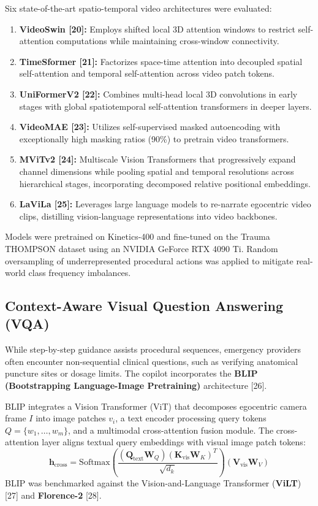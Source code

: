 \documentclass[12pt,a4paper]{report}
\begin{document}
Six state-of-the-art spatio-temporal video architectures were evaluated:
\begin{enumerate}
    \item \textbf{VideoSwin [20]:} Employs shifted local 3D attention windows to restrict self-attention computations while maintaining cross-window connectivity.
    \item \textbf{TimeSformer [21]:} Factorizes space-time attention into decoupled spatial self-attention and temporal self-attention across video patch tokens.
    \item \textbf{UniFormerV2 [22]:} Combines multi-head local 3D convolutions in early stages with global spatiotemporal self-attention transformers in deeper layers.
    \item \textbf{VideoMAE [23]:} Utilizes self-supervised masked autoencoding with exceptionally high masking ratios (90\%) to pretrain video transformers.
    \item \textbf{MViTv2 [24]:} Multiscale Vision Transformers that progressively expand channel dimensions while pooling spatial and temporal resolutions across hierarchical stages, incorporating decomposed relative positional embeddings.
    \item \textbf{LaViLa [25]:} Leverages large language models to re-narrate egocentric video clips, distilling vision-language representations into video backbones.
\end{enumerate}

Models were pretrained on Kinetics-400 and fine-tuned on the Trauma THOMPSON dataset using an NVIDIA GeForce RTX 4090 Ti. Random oversampling of underrepresented procedural actions was applied to mitigate real-world class frequency imbalances.

\subsection{Context-Aware Visual Question Answering (VQA)}
While step-by-step guidance assists procedural sequences, emergency providers often encounter non-sequential clinical questions, such as verifying anatomical puncture sites or dosage limits. The copilot incorporates the \textbf{BLIP (Bootstrapping Language-Image Pretraining)} architecture [26].

BLIP integrates a Vision Transformer (ViT) that decomposes egocentric camera frame $I$ into image patches $v_i$, a text encoder processing query tokens $Q = \{w_1, \dots, w_m\}$, and a multimodal cross-attention fusion module. The cross-attention layer aligns textual query embeddings with visual image patch tokens:
\begin{equation}
    \mathbf{h}_{\text{cross}} = \text{Softmax}\left(\frac{(\mathbf{Q}_{\text{text}}\mathbf{W}_Q)(\mathbf{K}_{\text{vis}}\mathbf{W}_K)^T}{\sqrt{d_k}}\right)(\mathbf{V}_{\text{vis}}\mathbf{W}_V)
\end{equation}
BLIP was benchmarked against the Vision-and-Language Transformer (\textbf{ViLT}) [27] and \textbf{Florence-2} [28].
\end{document}
